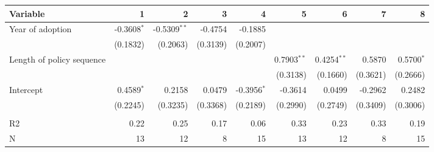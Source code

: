 \begin{tabular}{lrrrrrrrr}
\toprule
                  Variable &              1 &                2 &         3 &              4 &               5 &               6 &         7 &             8 \\
\midrule
          Year of adoption &  -0.3608$^{*}$ &  -0.5309$^{* *}$ &   -0.4754 &        -0.1885 &                 &                 &           &               \\
                           &       (0.1832) &         (0.2063) &  (0.3139) &       (0.2007) &                 &                 &           &               \\
 Length of policy sequence &                &                  &           &                &  0.7903$^{* *}$ &  0.4254$^{* *}$ &    0.5870 &  0.5700$^{*}$ \\
                           &                &                  &           &                &        (0.3138) &        (0.1660) &  (0.3621) &      (0.2666) \\
                 Intercept &   0.4589$^{*}$ &           0.2158 &    0.0479 &  -0.3956$^{*}$ &         -0.3614 &          0.0499 &   -0.2962 &        0.2482 \\
                           &       (0.2245) &         (0.3235) &  (0.3368) &       (0.2189) &        (0.2990) &        (0.2749) &  (0.3409) &      (0.3006) \\
                           &                &                  &           &                &                 &                 &           &               \\
                        R2 &           0.22 &             0.25 &      0.17 &           0.06 &            0.33 &            0.23 &      0.33 &          0.19 \\
                         N &             13 &               12 &         8 &             15 &              13 &              12 &         8 &            15 \\
\bottomrule
\end{tabular}
